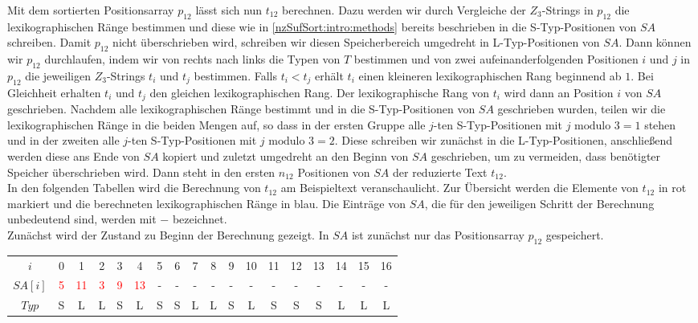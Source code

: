 Mit dem sortierten Positionsarray $p_{12}$ lässt sich nun $t_{12}$ berechnen. Dazu werden wir durch Vergleiche der $Z_3$-Strings in $p_{12}$ die lexikographischen Ränge bestimmen und diese wie in \cref{nzSufSort:intro:methods} bereits beschrieben in die S-Typ-Positionen von $SA$ schreiben. Damit $p_{12}$ nicht überschrieben wird, schreiben wir diesen Speicherbereich umgedreht in L-Typ-Positionen von $SA$. Dann können wir $p_{12}$ durchlaufen, indem wir von rechts nach links die Typen von $T$ bestimmen und von zwei aufeinanderfolgenden Positionen $i$ und $j$ in $p_{12}$ die jeweiligen $Z_3$-Strings $t_i$ und $t_j$ bestimmen. Falls $t_i < t_j$ erhält $t_i$ einen kleineren lexikographischen Rang beginnend ab $1$. Bei Gleichheit erhalten $t_i$ und $t_j$ den gleichen lexikographischen Rang. Der lexikographische Rang von $t_i$ wird dann an Position $i$ von $SA$ geschrieben. Nachdem alle lexikographischen Ränge bestimmt und in die S-Typ-Positionen von $SA$ geschrieben wurden, teilen wir die lexikographischen Ränge in die beiden Mengen auf, so dass in der ersten Gruppe alle $j$-ten S-Typ-Positionen mit $j \text{ modulo } 3 = 1$ stehen und in der zweiten alle $j$-ten S-Typ-Positionen mit $j \text{ modulo } 3 = 2$. Diese schreiben wir zunächst in die L-Typ-Positionen, anschließend werden diese ans Ende von $SA$ kopiert und zuletzt umgedreht an den Beginn von $SA$ geschrieben, um zu vermeiden, dass benötigter Speicher überschrieben wird. Dann steht in den ersten $n_{12}$ Positionen von $SA$ der reduzierte Text $t_{12}$. \\
In den folgenden Tabellen wird die Berechnung von $t_{12}$ am Beispieltext veranschaulicht. Zur Übersicht werden die Elemente von $t_{12}$ in rot markiert und die berechneten lexikographischen Ränge in blau. Die Einträge von $SA$, die für den jeweiligen Schritt der Berechnung unbedeutend sind, werden mit $-$ bezeichnet.\\
Zunächst wird der Zustand zu Beginn der Berechnung gezeigt. In $SA$ ist zunächst nur das Positionsarray $p_{12}$ gespeichert.

\begin{table}[H]
	\centering
	\begin{tabular}{c| c c c c c c c c c c c c c c c c c}
		$i$ & 0 & 1 & 2 & 3 & 4 & 5 & 6 & 7 & 8 & 9 & 10 & 11 & 12 & 13 & 14 & 15 & 16 \\
		$SA[i]$ & \textcolor{red}{5} & \textcolor{red}{11} & \textcolor{red}{3} & \textcolor{red}{9} & \textcolor{red}{13} & - & - & - & - & - & - & - & - & - & - & - & - \\
		$Typ$ & S & L & L & S & L & S & S & L & L & S & L & S & S & S & L & L & L
	\end{tabular}
\end{table}

